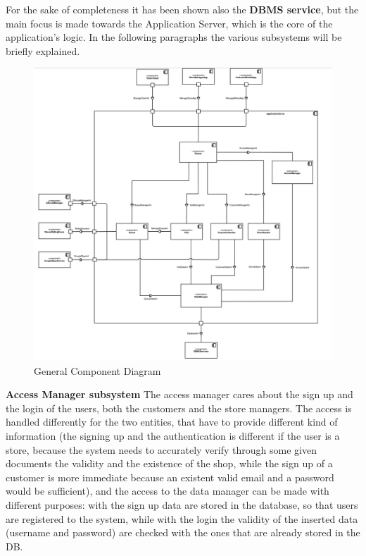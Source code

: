 \documentclass[]{article}
\begin{document}
	\textbf{} \newline
For the sake of completeness it has been shown also the \textbf{DBMS service}, but the main focus is made towards the Application Server, which is the core of the application’s logic. \newline\newline
In the following paragraphs the various subsystems will be briefly explained.\\

	\begin{figure}[H]
			\centering
			\includegraphics[scale=0.9]{ComponentView/ComponentViewDiagram.png}
			\caption{General Component Diagram}
			\label{fig:ComponentDiagram}
		\end{figure}
		\bigskip\bigskip


	\textbf{Access Manager subsystem} \newline
	The access manager cares about the sign up and the login of the users, both the customers and the store managers. The access is handled differently for the two entities, that have to provide different kind of information (the signing up and the authentication is different if the user is a store, because the system needs to accurately verify through some given documents the validity and the existence of the shop, while the sign up of a customer is more immediate because an existent valid email and a password would be sufficient), and the access to the data manager can be made with different purposes: with the sign up data are stored in the database, so that users are registered to the system, while with the login the validity of the inserted data (username and password) are checked with the ones that are already stored in the DB. 
\end{document}
